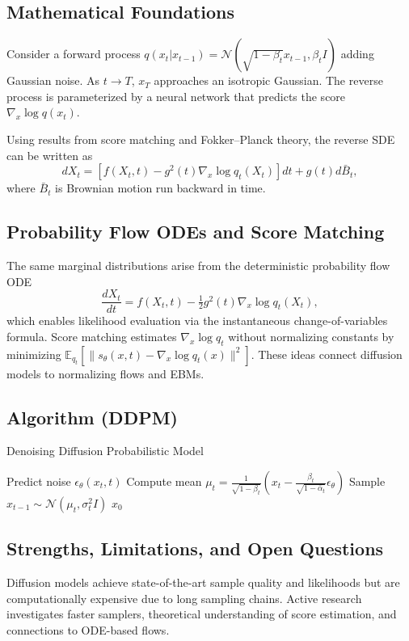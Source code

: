 \documentclass[11pt]{book}
\begin{document}
\subsection{Mathematical Foundations}
Consider a forward process $q(x_t|x_{t-1})=\mathcal{N}(\sqrt{1-\beta_t}x_{t-1},\beta_t I)$ adding Gaussian noise. As $t\to T$, $x_T$ approaches an isotropic Gaussian. The reverse process is parameterized by a neural network that predicts the score $\nabla_x \log q(x_t)$.

Using results from score matching \cite{hyvarinen2005} and Fokker--Planck theory, the reverse SDE can be written as
\begin{equation}
dX_t = \left[f(X_t,t) - g^2(t)\nabla_x \log q_t(X_t)\right]dt + g(t)d\bar{B}_t,
\end{equation}
where $\bar{B}_t$ is Brownian motion run backward in time.

\subsection{Probability Flow ODEs and Score Matching}
The same marginal distributions arise from the deterministic probability flow ODE
\begin{equation}
\frac{dX_t}{dt}=f(X_t,t)-\tfrac12 g^2(t)\nabla_x \log q_t(X_t),
\end{equation}
which enables likelihood evaluation via the instantaneous change-of-variables formula. Score matching estimates $\nabla_x\log q_t$ without normalizing constants by minimizing $\mathbb{E}_{q_t}[\|s_\theta(x,t)-\nabla_x\log q_t(x)\|^2]$. These ideas connect diffusion models to normalizing flows and EBMs.

\subsection{Algorithm (DDPM)}
\begin{algorithm}
\caption{Denoising Diffusion Probabilistic Model}
\begin{algorithmic}[1]
    \STATE Predict noise $\epsilon_\theta(x_t,t)$
    \STATE Compute mean $\mu_t=\frac{1}{\sqrt{1-\beta_t}}(x_t-\frac{\beta_t}{\sqrt{1-\bar{\alpha}_t}}\epsilon_\theta)$
    \STATE Sample $x_{t-1}\sim\mathcal{N}(\mu_t,\sigma_t^2 I)$
\ENDFOR
\RETURN $x_0$
\end{algorithmic}
\end{algorithm}

\subsection{Strengths, Limitations, and Open Questions}
Diffusion models achieve state-of-the-art sample quality and likelihoods but are computationally expensive due to long sampling chains. Active research investigates faster samplers, theoretical understanding of score estimation, and connections to ODE-based flows.
\end{document}
